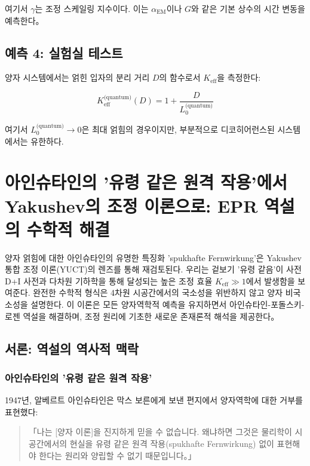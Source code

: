 \documentclass[11pt,a4paper]{article}
\begin{document}
여기서 $\gamma$는 조정 스케일링 지수이다. 이는 $\alpha_{\text{EM}}$이나 $G$와 같은 기본 상수의 시간 변동을 예측한다。

\subsection{예측 4: 실험실 테스트}

양자 시스템에서는 얽힌 입자의 분리 거리 $D$의 함수로서 $K_{\mathrm{eff}}$을 측정한다:

\begin{equation}
K_{\mathrm{eff}}^{\text{(quantum)}}(D) = 1 + \frac{D}{L_0^{\text{(quantum)}}}
\end{equation}

여기서 $L_0^{\text{(quantum)}} \to 0$은 최대 얽힘의 경우이지만, 부분적으로 디코히어런스된 시스템에서는 유한하다.

\section{아인슈타인의 '유령 같은 원격 작용'에서 Yakushev의 조정 이론으로: EPR 역설의 수학적 해결}
\label{sec:einstein-paradox}

양자 얽힘에 대한 아인슈타인의 유명한 특징화 'spukhafte Fernwirkung'은 Yakushev 통합 조정 이론(YUCT)의 렌즈를 통해 재검토된다. 우리는 겉보기 '유령 같음'이 사전 D+I 사전과 다차원 기하학을 통해 달성되는 높은 조정 효율 $K_{\mathrm{eff}} \gg 1$에서 발생함을 보여준다. 완전한 수학적 형식은 4차원 시공간에서의 국소성을 위반하지 않고 양자 비국소성을 설명한다. 이 이론은 모든 양자역학적 예측을 유지하면서 아인슈타인-포돌스키-로젠 역설을 해결하며, 조정 원리에 기초한 새로운 존재론적 해석을 제공한다。

\subsection{서론: 역설의 역사적 맥락}
\label{subsec:einstein-historical}

\subsubsection{아인슈타인의 '유령 같은 원격 작용'}
1947년, 알베르트 아인슈타인은 막스 보른에게 보낸 편지에서 양자역학에 대한 거부를 표현했다:

\begin{quote}
「나는 [양자 이론]을 진지하게 믿을 수 없습니다. 왜냐하면 그것은 물리학이 시공간에서의 현실을 유령 같은 원격 작용(spukhafte Fernwirkung) 없이 표현해야 한다는 원리와 양립할 수 없기 때문입니다。」
\end{quote}
\end{document}
